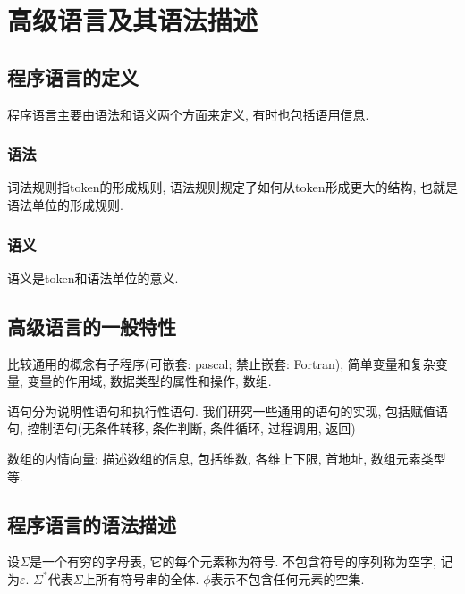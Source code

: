 \chapter{高级语言及其语法描述}

\section{程序语言的定义}

    程序语言主要由\textsf{语法}和\textsf{语义}两个方面来定义, 有时也包括\textsf{语用}信息.

    \subsection{语法}

        \textsf{词法规则}指token的形成规则, \textsf{语法规则}规定了如何从token形成更大的结构, 也就是语法单位的形成规则.        

    \subsection{语义}

        \textsf{语义}是token和语法单位的意义. 

\section{高级语言的一般特性}

    比较通用的概念有子程序(可嵌套: pascal; 禁止嵌套: Fortran), 简单变量和复杂变量, 变量的作用域, 数据类型的属性和操作, 数组.

    语句分为\textsf{说明性语句}和\textsf{执行性语句}. 我们研究一些通用的语句的实现, 包括赋值语句, 控制语句(无条件转移, 条件判断, 条件循环, 过程调用, 返回)

    \textsf{数组的内情向量}: 描述数组的信息, 包括维数, 各维上下限, 首地址, 数组元素类型等.

\section{程序语言的语法描述}

    设$\Sigma$是一个有穷的\textsf{字母表}, 它的每个元素称为\textsf{符号}. 不包含符号的序列称为\textsf{空字}, 记为$\varepsilon$. $\Sigma^*$代表$\Sigma$上所有符号串的全体. $\phi$表示不包含任何元素的空集.
